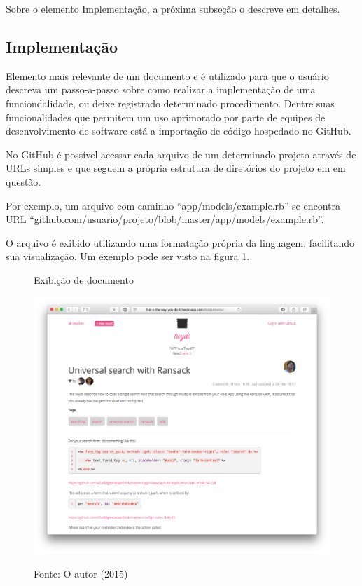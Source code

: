 Sobre o elemento Implementação, a próxima subseção o descreve em detalhes.

\subsection{Implementação}

Elemento mais relevante de um documento e é utilizado para que o usuário descreva um passo-a-passo sobre como realizar a implementação de uma funciondalidade, ou deixe registrado determinado procedimento. Dentre suas funcionalidades que permitem um uso aprimorado por parte de equipes de desenvolvimento de software está a importação de código hospedado no GitHub.

No GitHub é possível acessar cada arquivo de um determinado projeto através de URLs simples e que seguem a própria estrutura de diretórios do projeto em em questão.

Por exemplo, um arquivo com caminho ``app/models/example.rb'' se encontra URL ``github.com/usuario/projeto/blob/master/app/models/example.rb''.

O arquivo é exibido utilizando uma formatação própria da linguagem, facilitando sua visualização. Um exemplo pode ser visto na figura \ref{fig:doc-show-show}.

\begin{figure}[h]
	\centering
    \caption{Exibição de documento}
    \includegraphics[width=15cm]{Imagens/print-implementation-1.png}
		\label{fig:doc-show-show}
	\caption*{Fonte: O autor (2015)}
\end{figure}

